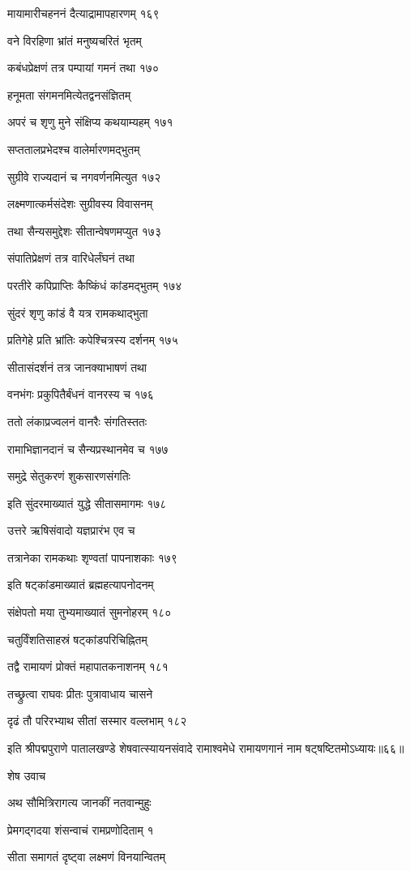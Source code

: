 मायामारीचहननं दैत्याद्रामापहारणम् १६९

वने विरहिणा भ्रांतं मनुष्यचरितं भृतम्

कबंधप्रेक्षणं तत्र पम्पायां गमनं तथा १७०

हनूमता संगमनमित्येतद्वनसंज्ञितम्

अपरं च शृणु मुने संक्षिप्य कथयाम्यहम् १७१

सप्ततालप्रभेदश्च वालेर्मारणमद्भुतम्

सुग्रीवे राज्यदानं च नगवर्णनमित्युत १७२

लक्ष्मणात्कर्मसंदेशः सुग्रीवस्य विवासनम्

तथा सैन्यसमुद्देशः सीतान्वेषणमप्युत १७३

संपातिप्रेक्षणं तत्र वारिधेर्लंघनं तथा

परतीरे कपिप्राप्तिः कैष्किंधं कांडमद्भुतम् १७४

सुंदरं शृणु कांडं वै यत्र रामकथाद्भुता

प्रतिगेहे प्रति भ्रांतिः कपेश्चित्रस्य दर्शनम् १७५

सीतासंदर्शनं तत्र जानक्याभाषणं तथा

वनभंगः प्रकुपितैर्बंधनं वानरस्य च १७६

ततो लंकाप्रज्वलनं वानरैः संगतिस्ततः

रामाभिज्ञानदानं च सैन्यप्रस्थानमेव च १७७

समुद्रे सेतुकरणं शुकसारणसंगतिः

इति सुंदरमाख्यातं युद्धे सीतासमागमः १७८

उत्तरे ऋषिसंवादो यज्ञप्रारंभ एव च

तत्रानेका रामकथाः शृण्वतां पापनाशकाः १७९

इति षट्कांडमाख्यातं ब्रह्महत्यापनोदनम्

संक्षेपतो मया तुभ्यमाख्यातं सुमनोहरम् १८०

चतुर्विंशतिसाहस्रं षट्कांडपरिचिह्नितम्

तद्वै रामायणं प्रोक्तं महापातकनाशनम् १८१

तच्छ्रुत्वा राघवः प्रीतः पुत्रावाधाय चासने

दृढं तौ परिरभ्याथ सीतां सस्मार वल्लभाम् १८२

इति श्रीपद्मपुराणे पातालखण्डे शेषवात्स्यायनसंवादे रामाश्वमेधे रामायणगानं नाम षट्षष्टितमोऽध्यायः॥६६॥


शेष उवाच

अथ सौमित्रिरागत्य जानकीं नतवान्मुहुः

प्रेमगद्गदया शंसन्वाचं रामप्रणोदिताम् १

सीता समागतं दृष्ट्वा लक्ष्मणं विनयान्वितम्

